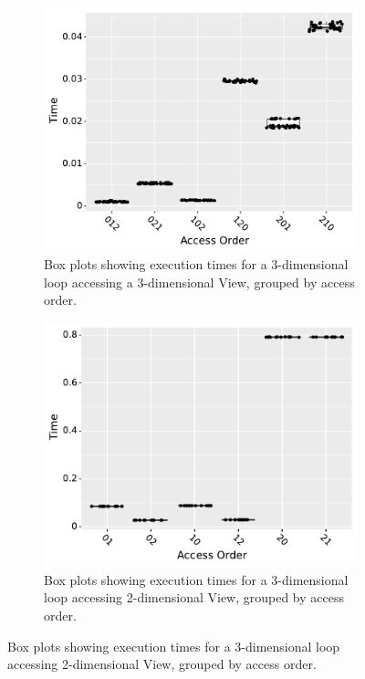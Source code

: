 \documentclass[sigconf,review=true]{acmart}
\begin{document}
\begin{figure}
  \centering
  \begin{subfigure}{0.48\textwidth}
	\includegraphics[width=\textwidth]{benchmark1_boxplot.pdf}
	\caption{Box plots showing execution times for a 3-dimensional loop accessing a 3-dimensional View, grouped by access order. }
	\label{AccessBenchmark1}
  \end{subfigure}
  \hfill
\begin{subfigure}{0.48\textwidth}
	\includegraphics[width=\textwidth]{benchmark2_boxplot.pdf}
	\caption{Box plots showing execution times for a 3-dimensional loop accessing 2-dimensional View, grouped by access order. }
	\label{AccessBenchmark2}
\end{subfigure}


\end{figure}
\end{document}
